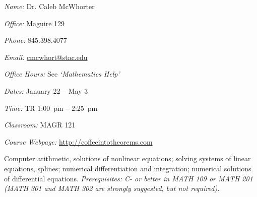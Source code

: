 \documentclass[11pt,letterpaper]{article}
\makeatletter
\newcommand{\classdates}{January 22 -- May 3}
\newcommand{\classtimes}{TR 1:00~pm -- 2:25~pm}
\newcommand{\classroom}{MAGR 121}
\newcommand{\instructor}{Dr. Caleb McWhorter}
\newcommand{\office}{Maguire 129}
\newcommand{\phone}{845.398.4077}
\newcommand{\email}{cmcwhort@stac.edu}
\newcommand{\website}{http://coffeeintotheorems.com}
\newcommand{\officehours}{See \textit{`Mathematics Help'}}
\makeatother
\begin{document}




\textit{Name:} \instructor \par
\textit{Office:} \office \par
\textit{Phone:} \phone \par
\textit{Email:} \href{mailto:\email}{\email} \par
\textit{Office Hours:} \officehours 
\pspace



\textit{Dates:} \classdates \par
\textit{Time:} \classtimes \par
\textit{Classroom:} \classroom \par
\textit{Course Webpage:} \href{\website}{\website}
\sectionbreak





\newpage




Computer arithmetic, solutions of nonlinear equations; solving systems of linear equations, splines; numerical differentiation and integration; numerical solutions of differential equations. {\itshape Prerequisites: C- or better in MATH 109 or MATH 201 (MATH 301 and MATH 302 are strongly suggested, but not required).} \sectionbreak
\end{document}
